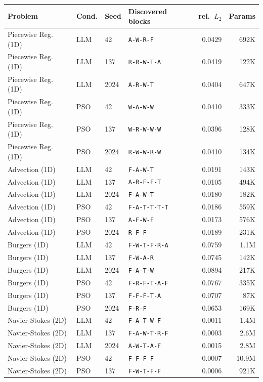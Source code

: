 \begin{tabular}{llllrr}
\toprule
Problem & Cond. & Seed & Discovered blocks & rel.\ $L_2$ & Params \\
\midrule
Piecewise Reg. (1D) & LLM & 42 & \texttt{A-W-R-F} & 0.0429 & 692K \\
Piecewise Reg. (1D) & LLM & 137 & \texttt{R-R-W-T-A} & 0.0419 & 122K \\
Piecewise Reg. (1D) & LLM & 2024 & \texttt{A-R-W-T} & 0.0404 & 647K \\
Piecewise Reg. (1D) & PSO & 42 & \texttt{W-A-W-W} & 0.0410 & 333K \\
Piecewise Reg. (1D) & PSO & 137 & \texttt{W-R-W-W-W} & 0.0396 & 128K \\
Piecewise Reg. (1D) & PSO & 2024 & \texttt{R-W-W-R-W} & 0.0410 & 134K \\
\midrule
Advection (1D) & LLM & 42 & \texttt{F-A-W-T} & 0.0191 & 143K \\
Advection (1D) & LLM & 137 & \texttt{A-R-F-F-T} & 0.0105 & 494K \\
Advection (1D) & LLM & 2024 & \texttt{F-A-W-T} & 0.0180 & 182K \\
Advection (1D) & PSO & 42 & \texttt{F-A-T-T-T-T} & 0.0186 & 559K \\
Advection (1D) & PSO & 137 & \texttt{A-F-W-F} & 0.0173 & 576K \\
Advection (1D) & PSO & 2024 & \texttt{R-F-F} & 0.0189 & 231K \\
\midrule
Burgers (1D) & LLM & 42 & \texttt{F-W-T-F-R-A} & 0.0759 & 1.1M \\
Burgers (1D) & LLM & 137 & \texttt{F-W-A-R} & 0.0745 & 142K \\
Burgers (1D) & LLM & 2024 & \texttt{F-A-T-W} & 0.0894 & 217K \\
Burgers (1D) & PSO & 42 & \texttt{F-R-F-T-A-F} & 0.0767 & 335K \\
Burgers (1D) & PSO & 137 & \texttt{F-F-F-T-A} & 0.0707 & 87K \\
Burgers (1D) & PSO & 2024 & \texttt{F-R-F} & 0.0653 & 169K \\
\midrule
Navier-Stokes (2D) & LLM & 42 & \texttt{F-A-T-W-F} & 0.0011 & 1.4M \\
Navier-Stokes (2D) & LLM & 137 & \texttt{F-A-W-T-R-F} & 0.0003 & 2.6M \\
Navier-Stokes (2D) & LLM & 2024 & \texttt{A-W-T-A-F} & 0.0015 & 2.8M \\
Navier-Stokes (2D) & PSO & 42 & \texttt{F-F-F-F} & 0.0007 & 10.9M \\
Navier-Stokes (2D) & PSO & 137 & \texttt{F-W-T-F-F} & 0.0006 & 921K \\

\end{tabular}
